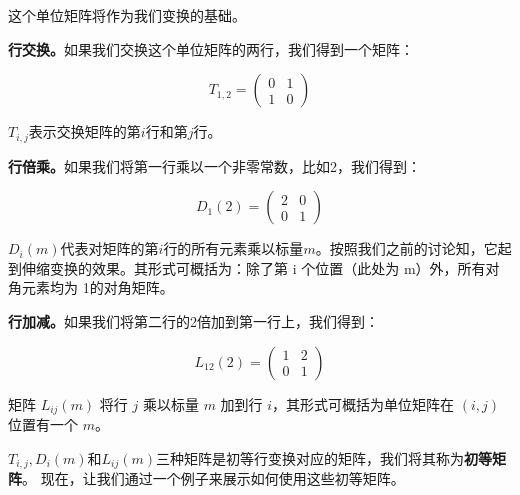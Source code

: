 这个单位矩阵将作为我们变换的基础。

\textbf{行交换。}如果我们交换这个单位矩阵的两行，我们得到一个矩阵：

\[ T_{1,2} = \begin{pmatrix} 0 & 1 \\ 1 & 0 \end{pmatrix} \]

$T_{i,j}$表示交换矩阵的第$i$行和第$j$行。

\textbf{行倍乘。}如果我们将第一行乘以一个非零常数，比如2，我们得到：

\[ D_{1}(2) = \begin{pmatrix} 2 & 0 \\ 0 & 1 \end{pmatrix} \]

$D_{i}(m)$代表对矩阵的第$i$行的所有元素乘以标量$m$。按照我们之前的讨论知，它起到伸缩变换的效果。其形式可概括为：除了第 i 个位置（此处为 m）外，所有对角元素均为 1的对角矩阵。

\textbf{行加减。}如果我们将第二行的2倍加到第一行上，我们得到：

\[ L_{12}(2) = \begin{pmatrix} 1 & 2 \\ 0 & 1 \end{pmatrix} \]

矩阵 $L_{ij}(m)$ 将行 $j$ 乘以标量 $m$ 加到行 $i$，其形式可概括为单位矩阵在 $(i, j)$ 位置有一个 $m$。

$T_{i,j}, D_{i}(m)\text{和}L_{ij}(m)$三种矩阵是初等行变换对应的矩阵，我们将其称为\textcolor{third}{\bf 初等矩阵}。
现在，让我们通过一个例子来展示如何使用这些初等矩阵。

